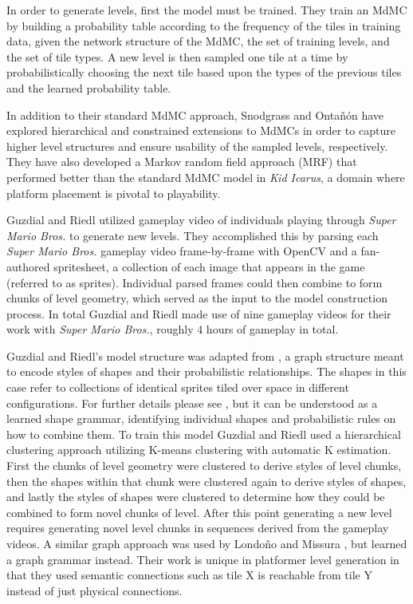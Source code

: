 \documentclass[12pt]{report}
\begin{document}
In order to generate levels, first the model must be trained. They train an MdMC by building a probability table according to the frequency of the tiles in training data, given the network structure of the MdMC, the set of training levels, and the set of tile types. A new level is then sampled one tile at a time by probabilistically choosing the next tile based upon the types of the previous tiles and the learned probability table.

In addition to their standard MdMC approach, Snodgrass and Onta{\~n}{\'o}n have explored hierarchical \cite{snodgrass2015hierarchical} and constrained \cite{snodgrassconstrained} extensions to MdMCs in order to capture higher level structures and ensure usability of the sampled levels, respectively. They have also developed a Markov random field approach (MRF) \cite{snodgrass2016learning} that performed better than the standard MdMC model in \textit{Kid Icarus}, a domain where platform placement is pivotal to playability.


 Guzdial and Riedl utilized gameplay video of individuals playing through \textit{Super Mario Bros.} to generate new levels. They accomplished this by parsing each \textit{Super Mario Bros.} gameplay video frame-by-frame with OpenCV \cite{Pulli:2012:RCV:2184319.2184337} and a fan-authored spritesheet, a collection of each image that appears in the game (referred to as sprites). Individual parsed frames could then combine to form chunks of level geometry, which served as the input to the model construction process. In total Guzdial and Riedl made use of nine gameplay videos for their work with \textit{Super Mario Bros.}, roughly 4 hours of gameplay in total.

Guzdial and Riedl's model structure was adapted from \cite{kalogerakis:2012:SIG}, a graph structure meant to encode styles of shapes and their probabilistic relationships. The shapes in this case refer to collections of identical sprites tiled over space in different configurations. For further details please see \cite{guzdial2016game}, but it can be understood as a learned shape grammar, identifying individual shapes and probabilistic rules on how to combine them. To train this model Guzdial and Riedl used a hierarchical clustering approach utilizing K-means clustering with automatic K estimation. First the chunks of level geometry were clustered to derive styles of level chunks, then the shapes within that chunk were clustered again to derive styles of shapes, and lastly the styles of shapes were clustered to determine how they could be combined to form novel chunks of level. After this point generating a new level requires generating novel level chunks in sequences derived from the gameplay videos.   A similar graph approach was used by Londo\~{n}o and Missura \cite{MARIOGRAPHGRAMMAR}, but learned a graph grammar instead.  Their work is unique in platformer level generation in that they used semantic connections such as tile X is reachable from tile Y instead of just physical connections.
\end{document}
